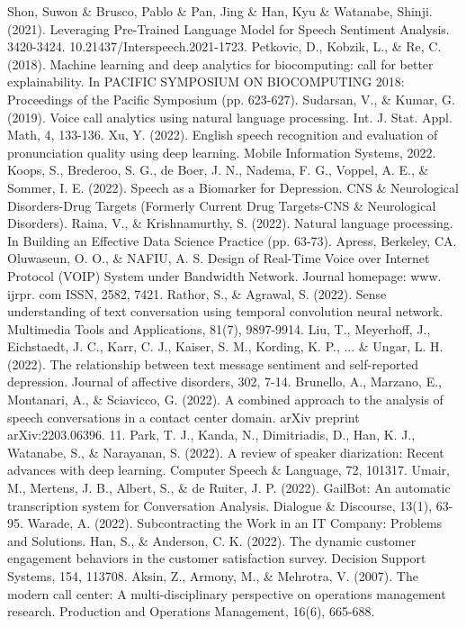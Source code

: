 \documentclass[conference]{IEEEtran}
\begin{document}
\begin{thebibliography}{00}
 Shon, Suwon \& Brusco, Pablo \& Pan, Jing \& Han, Kyu \& Watanabe, Shinji. (2021). Leveraging Pre-Trained Language Model for Speech Sentiment Analysis. 3420-3424. 10.21437/Interspeech.2021-1723.
 Petkovic, D., Kobzik, L., \& Re, C. (2018). Machine learning and deep analytics for biocomputing: call for better explainability. In PACIFIC SYMPOSIUM ON BIOCOMPUTING 2018: Proceedings of the Pacific Symposium (pp. 623-627).
 Sudarsan, V., \& Kumar, G. (2019). Voice call analytics using natural language processing. Int. J. Stat. Appl. Math, 4, 133-136.
 Xu, Y. (2022). English speech recognition and evaluation of pronunciation quality using deep learning. Mobile Information Systems, 2022.
 Koops, S., Brederoo, S. G., de Boer, J. N., Nadema, F. G., Voppel, A. E., \& Sommer, I. E. (2022). Speech as a Biomarker for Depression. CNS \& Neurological Disorders-Drug Targets (Formerly Current Drug Targets-CNS \& Neurological Disorders).
 Raina, V., \& Krishnamurthy, S. (2022). Natural language processing. In Building an Effective Data Science Practice (pp. 63-73). Apress, Berkeley, CA.
 Oluwaseun, O. O., \& NAFIU, A. S. Design of Real-Time Voice over Internet Protocol (VOIP) System under Bandwidth Network. Journal homepage: www. ijrpr. com ISSN, 2582, 7421.
 Rathor, S., \& Agrawal, S. (2022). Sense understanding of text conversation using temporal convolution neural network. Multimedia Tools and Applications, 81(7), 9897-9914.
 Liu, T., Meyerhoff, J., Eichstaedt, J. C., Karr, C. J., Kaiser, S. M., Kording, K. P., ... \& Ungar, L. H. (2022). The relationship between text message sentiment and self-reported depression. Journal of affective disorders, 302, 7-14.
 Brunello, A., Marzano, E., Montanari, A., \& Sciavicco, G. (2022). A combined approach to the analysis of speech conversations in a contact center domain. arXiv preprint arXiv:2203.06396.
 11.	Park, T. J., Kanda, N., Dimitriadis, D., Han, K. J., Watanabe, S., \& Narayanan, S. (2022). A review of speaker diarization: Recent advances with deep learning. Computer Speech \& Language, 72, 101317.
 Umair, M., Mertens, J. B., Albert, S., \& de Ruiter, J. P. (2022). GailBot: An automatic transcription system for Conversation Analysis. Dialogue \& Discourse, 13(1), 63-95.
 Warade, A. (2022). Subcontracting the Work in an IT Company: Problems and Solutions.
 Han, S., \& Anderson, C. K. (2022). The dynamic customer engagement behaviors in the customer satisfaction survey. Decision Support Systems, 154, 113708.
 Aksin, Z., Armony, M., \& Mehrotra, V. (2007). The modern call center: A multi‐disciplinary perspective on operations management research. Production and Operations Management, 16(6), 665-688.
\end{thebibliography}
\vspace{12pt}
\end{document}

